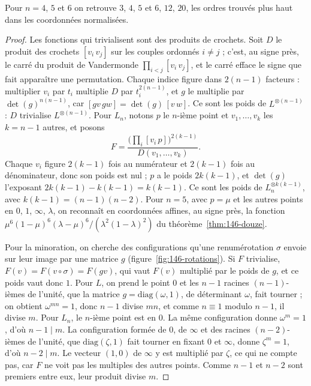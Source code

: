 Pour $n = 4$, $5$ et $6$ on retrouve $3$, $4$, $5$ et $6$, $12$, $20$, les ordres trouvés plus haut dans les coordonnées normalisées.

\begin{proof}
Les fonctions qui trivialisent sont des produits de crochets. Soit $D$ le produit des crochets $[v_i\,v_j]$ sur les couples ordonnés $i \neq j$ ; c'est, au signe près, le carré du produit de Vandermonde $\prod_{i < j}[v_i\,v_j]$, et le carré efface le signe que fait apparaître une permutation. Chaque indice figure dans $2(n - 1)$ facteurs : multiplier $v_i$ par $t_i$ multiplie $D$ par $t_i^{2(n-1)}$, et $g$ le multiplie par $\det(g)^{n(n-1)}$, car $[g v\,g w] = \det(g)\,[v\,w]$. Ce sont les poids de $L^{\otimes (n-1)}$ : $D$ trivialise $L^{\otimes(n-1)}$. Pour $L_n$, notons $p$ le $n$-ième point et $v_1, \ldots, v_k$ les $k = n - 1$ autres, et posons
\[
F = \frac{\bigl(\prod_i [v_i\,p]\bigr)^{2(k-1)}}{D(v_1, \ldots, v_k)}.
\]
Chaque $v_i$ figure $2(k - 1)$ fois au numérateur et $2(k - 1)$ fois au dénominateur, donc son poids est nul ; $p$ a le poids $2k(k - 1)$, et $\det(g)$ l'exposant $2k(k - 1) - k(k - 1) = k(k - 1)$. Ce sont les poids de $L_n^{\otimes k(k-1)}$, avec $k(k - 1) = (n - 1)(n - 2)$. Pour $n = 5$, avec $p = \mu$ et les autres points en $0$, $1$, $\infty$, $\lambda$, on reconnaît en coordonnées affines, au signe près, la fonction $\mu^6(1 - \mu)^6(\lambda - \mu)^6/(\lambda^2(1 - \lambda)^2)$ du théorème~\ref{thm:146-douze}.

Pour la minoration, on cherche des configurations qu'une renumérotation $\sigma$ envoie sur leur image par une matrice $g$ (figure~\ref{fig:146-rotations}). Si $F$ trivialise, $F(v) = F(v \circ \sigma) = F(g v)$, qui vaut $F(v)$ multiplié par le poids de $g$, et ce poids vaut donc $1$. Pour $L$, on prend le point $0$ et les $n - 1$ racines $(n-1)$-ièmes de l'unité, que la matrice $g = \mathrm{diag}(\omega, 1)$, de déterminant $\omega$, fait tourner ; on obtient $\omega^{mn} = 1$, donc $n - 1$ divise $mn$, et comme $n \equiv 1$ modulo $n - 1$, il divise $m$. Pour $L_n$, le $n$-ième point est en $0$. La même configuration donne $\omega^m = 1$, d'où $n - 1 \mid m$. La configuration formée de $0$, de $\infty$ et des racines $(n-2)$-ièmes de l'unité, que $\mathrm{diag}(\zeta, 1)$ fait tourner en fixant $0$ et $\infty$, donne $\zeta^m = 1$, d'où $n - 2 \mid m$. Le vecteur $(1, 0)$ de $\infty$ y est multiplié par $\zeta$, ce qui ne compte pas, car $F$ ne voit pas les multiples des autres points. Comme $n - 1$ et $n - 2$ sont premiers entre eux, leur produit divise $m$.
\end{proof}

